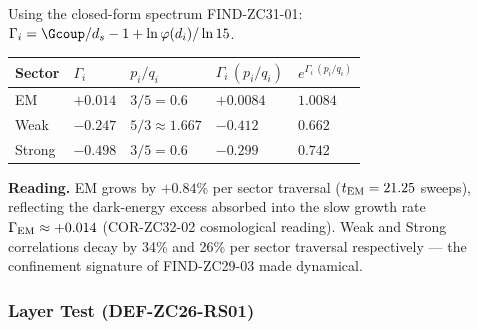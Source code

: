 \documentclass[12pt, a4paper]{article}
\begin{document}
\begin{derivedbox}[title={Correlation per sector traversal
  (THM-ZC33-02b)}]
Using the closed-form spectrum FIND-ZC31-01:
$\Gamma_i = \Gcoup/d_s - 1 + \ln\varphi(d_i)/\ln 15$.

\medskip
{\small
\renewcommand{\arraystretch}{1.30}
\begin{tabular}{>{\raggedright\arraybackslash}p{1.6cm}
                >{\centering\arraybackslash}p{1.8cm}
                >{\centering\arraybackslash}p{1.6cm}
                >{\centering\arraybackslash}p{2.6cm}
                >{\centering\arraybackslash}p{2.4cm}}
\toprule
\textbf{Sector} & $\Gamma_i$ & $p_i/q_i$ &
  $\Gamma_i\,(p_i/q_i)$ & $e^{\Gamma_i\,(p_i/q_i)}$ \\
\midrule
EM & $+0.014$ & $3/5 = 0.6$ & $+0.0084$ & $1.0084$ \\
Weak & $-0.247$ & $5/3 \approx 1.667$ & $-0.412$ & $0.662$ \\
Strong & $-0.498$ & $3/5 = 0.6$ & $-0.299$ & $0.742$ \\
\bottomrule
\end{tabular}
}

\medskip
\textbf{Reading.} EM grows by $+0.84\%$ per sector traversal
($t_{\rm EM} = 21.25$ sweeps), reflecting the dark-energy
excess absorbed into the slow growth rate
$\Gamma_{\rm EM} \approx +0.014$ (COR-ZC32-02 cosmological
reading). Weak and Strong correlations decay by 34\% and
26\% per sector traversal respectively --- the confinement
signature of FIND-ZC29-03 made dynamical.
\end{derivedbox}

\subsubsection{Layer Test (DEF-ZC26-RS01)}
\end{document}
